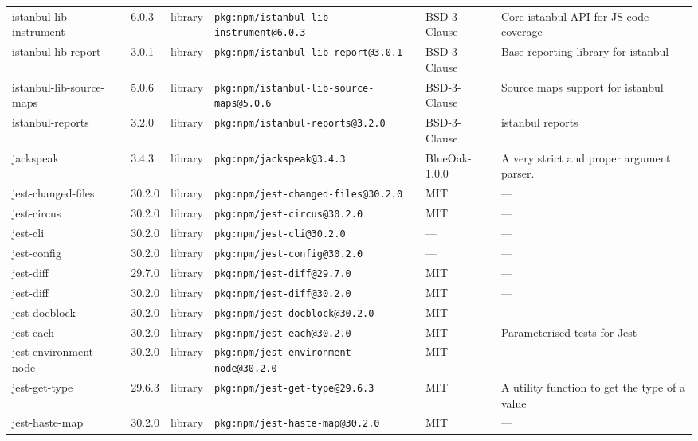 \documentclass[11pt,a4paper]{article}
\begin{document}
\begin{longtable}{|p{4cm}|p{2cm}|p{1.6cm}|p{5cm}|p{1.5cm}|p{3.5cm}|}
\raggedright istanbul-lib-instrument & 6.0.3 & library & \small\texttt{pkg:npm/istanbul-lib-instrument@6.0.3} & BSD-3-Clause & \small Core istanbul API for JS code coverage \\
\raggedright istanbul-lib-report & 3.0.1 & library & \small\texttt{pkg:npm/istanbul-lib-report@3.0.1} & BSD-3-Clause & \small Base reporting library for istanbul \\
\raggedright istanbul-lib-source-maps & 5.0.6 & library & \small\texttt{pkg:npm/istanbul-lib-source-maps@5.0.6} & BSD-3-Clause & \small Source maps support for istanbul \\
\raggedright istanbul-reports & 3.2.0 & library & \small\texttt{pkg:npm/istanbul-reports@3.2.0} & BSD-3-Clause & \small istanbul reports \\
\raggedright jackspeak & 3.4.3 & library & \small\texttt{pkg:npm/jackspeak@3.4.3} & BlueOak-1.0.0 & \small A very strict and proper argument parser. \\
\raggedright jest-changed-files & 30.2.0 & library & \small\texttt{pkg:npm/jest-changed-files@30.2.0} & MIT & \small — \\
\raggedright jest-circus & 30.2.0 & library & \small\texttt{pkg:npm/jest-circus@30.2.0} & MIT & \small — \\
\raggedright jest-cli & 30.2.0 & library & \small\texttt{pkg:npm/jest-cli@30.2.0} & — & \small — \\
\raggedright jest-config & 30.2.0 & library & \small\texttt{pkg:npm/jest-config@30.2.0} & — & \small — \\
\raggedright jest-diff & 29.7.0 & library & \small\texttt{pkg:npm/jest-diff@29.7.0} & MIT & \small — \\
\raggedright jest-diff & 30.2.0 & library & \small\texttt{pkg:npm/jest-diff@30.2.0} & MIT & \small — \\
\raggedright jest-docblock & 30.2.0 & library & \small\texttt{pkg:npm/jest-docblock@30.2.0} & MIT & \small — \\
\raggedright jest-each & 30.2.0 & library & \small\texttt{pkg:npm/jest-each@30.2.0} & MIT & \small Parameterised tests for Jest \\
\raggedright jest-environment-node & 30.2.0 & library & \small\texttt{pkg:npm/jest-environment-node@30.2.0} & MIT & \small — \\
\raggedright jest-get-type & 29.6.3 & library & \small\texttt{pkg:npm/jest-get-type@29.6.3} & MIT & \small A utility function to get the type of a value \\
\raggedright jest-haste-map & 30.2.0 & library & \small\texttt{pkg:npm/jest-haste-map@30.2.0} & MIT & \small — \\

\end{longtable}
\end{document}
